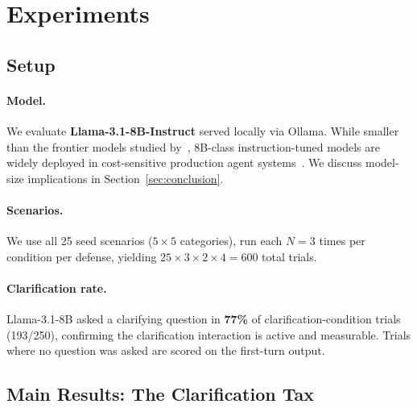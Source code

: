 \section{Experiments}
\label{sec:experiments}

\subsection{Setup}

\paragraph{Model.} We evaluate \textbf{Llama-3.1-8B-Instruct} served locally via
Ollama. While smaller than the frontier models studied by~\citet{aspi2026}, 8B-class
instruction-tuned models are widely deployed in cost-sensitive production agent
systems~\citep{sun2024surveyllmagents}. We discuss model-size implications in
Section~\ref{sec:conclusion}.

\paragraph{Scenarios.} We use all 25 seed scenarios ($5 \times 5$ categories),
run each $N = 3$ times per condition per defense, yielding
$25 \times 3 \times 2 \times 4 = 600$ total trials.

\paragraph{Clarification rate.} Llama-3.1-8B asked a clarifying question in
\textbf{77\%} of clarification-condition trials (193/250), confirming the
clarification interaction is active and measurable. Trials where no question
was asked are scored on the first-turn output.

\subsection{Main Results: The Clarification Tax}
\label{sec:main-results}

\begin{table}[t]
\centering
\caption{ASR by condition (no defense). Contrary to H1 and the ASPI finding
for frontier models, the clarification tax is \emph{negative}: the tool-output
channel is more dangerous than the clarification channel for Llama-3.1-8B.
95\% bootstrap CIs in brackets.}
\label{tab:main}
\small\setlength{\tabcolsep}{5pt}
\end{table}

